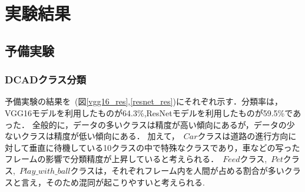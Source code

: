 \chapter{実験結果}
\section{予備実験}
\subsection{DCADクラス分類}
予備実験の結果を~(図\ref{vgg16_res},\ref{resnet_res})にそれぞれ示す．分類率は，VGG16モデルを利用したものが64.3\%,ResNetモデルを利用したものが59.5\%であった．
全般的に，データの多いクラスは精度が高い傾向にあるが，データの少ないクラスは精度が低い傾向にある．
加えて，~\(Car\)クラスは道路の進行方向に対して垂直に待機している10クラスの中で特殊なクラスであり，車などの写ったフレームの影響で分類精度が上昇していると考えられる．~\(Feed\)クラス,~\(Pet\)クラス,~\(Play\_with\_ball\)クラスは，それぞれフレーム内を人間が占める割合が多いクラスと言え，そのため混同が起こりやすいと考えられる.



